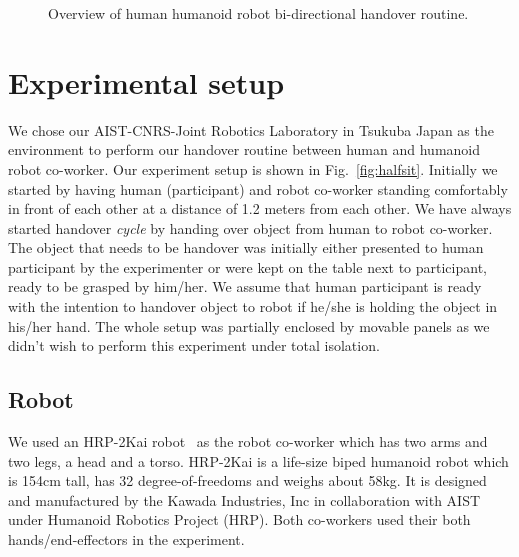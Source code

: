\begin{figure}[htp]
	
	\caption{Overview of human humanoid robot bi-directional handover routine.}
	\label{fig:handover routine}
\end{figure}

\clearpage

\section{Experimental setup}
We chose our AIST-CNRS-Joint Robotics Laboratory in Tsukuba Japan as the environment to perform our handover routine between human and humanoid robot co-worker. Our experiment setup is shown in Fig.~\ref{fig:halfsit}. Initially we started by having human (participant) and robot co-worker standing comfortably in front of each other at a distance of 1.2 meters from each other. We have always started handover \textit{cycle} by handing over object from human to robot co-worker. The object that needs to be handover was initially either presented to human participant by the experimenter or were kept on the table next to participant, ready to be grasped by him/her. We assume that human participant is ready with the intention to handover object to robot if he/she is holding the object in his/her hand. The whole setup was partially enclosed by movable panels as we didn't wish to perform this experiment under total isolation.


\subsection{Robot}
We used an HRP-2Kai robot~\cite{Kaneko:RAS_ICHR:2015} as the robot co-worker which has two arms and two legs, a head and a torso. HRP-2Kai is a life-size biped humanoid robot which is 154cm tall, has 32 degree-of-freedoms and weighs about 58kg. It is designed and manufactured by the Kawada Industries, Inc in collaboration with AIST under Humanoid Robotics Project (HRP). Both co-workers used their both hands/end-effectors in the experiment.



